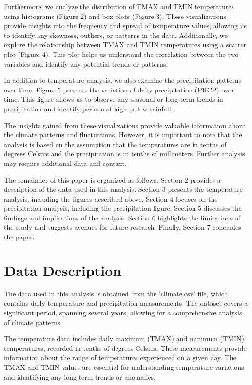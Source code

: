 \documentclass{article}
\begin{document}
Furthermore, we analyze the distribution of TMAX and TMIN temperatures using histograms (Figure 2) and box plots (Figure 3). These visualizations provide insights into the frequency and spread of temperature values, allowing us to identify any skewness, outliers, or patterns in the data. Additionally, we explore the relationship between TMAX and TMIN temperatures using a scatter plot (Figure 4). This plot helps us understand the correlation between the two variables and identify any potential trends or patterns.

In addition to temperature analysis, we also examine the precipitation patterns over time. Figure 5 presents the variation of daily precipitation (PRCP) over time. This figure allows us to observe any seasonal or long-term trends in precipitation and identify periods of high or low rainfall.

The insights gained from these visualizations provide valuable information about the climate patterns and fluctuations. However, it is important to note that the analysis is based on the assumption that the temperatures are in tenths of degrees Celsius and the precipitation is in tenths of millimeters. Further analysis may require additional data and context.

The remainder of this paper is organized as follows. Section 2 provides a description of the data used in this analysis. Section 3 presents the temperature analysis, including the figures described above. Section 4 focuses on the precipitation analysis, including the precipitation figure. Section 5 discusses the findings and implications of the analysis. Section 6 highlights the limitations of the study and suggests avenues for future research. Finally, Section 7 concludes the paper.

\section{Data Description}

The data used in this analysis is obtained from the 'climate.csv' file, which contains daily temperature and precipitation measurements. The dataset covers a significant period, spanning several years, allowing for a comprehensive analysis of climate patterns.

The temperature data includes daily maximum (TMAX) and minimum (TMIN) temperatures, recorded in tenths of degrees Celsius. These measurements provide information about the range of temperatures experienced on a given day. The TMAX and TMIN values are essential for understanding temperature variations and identifying any long-term trends or anomalies.
\end{document}
